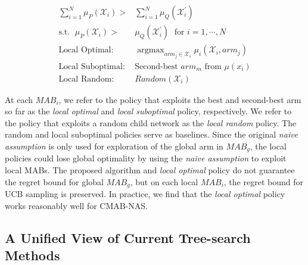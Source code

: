 \documentclass[conference]{IEEEtran}
\def \X {\mathcal{X}}
\DeclareMathOperator*{\argmax}{argmax}
\begin{document}
\begin{linenomath*}
\begin{align} 
\label{navie_assumption_2}
\sum_{i=1}^{N}\mu_{P}(\X_{i}) >& \sum_{i=1}^{N}\mu_{Q}(\X^\prime_{i}) \\
\nonumber \text{s.t. } \; \mu_{P}(\mathcal{X}_{i}) >& \mu_{Q}(\mathcal{X}^\prime_{i}) \;  \text{ for } i = 1, \cdots, N \\
\label{optimal_policy} \text{Local Optimal: }     & \argmax_{arm_j\in\X_i} \mu_i(\X_{i}, arm_j) \\ 
\label{sub-optimal_Policy} \text{Local Suboptimal: } & \text{Second-best $arm_m$ from $\mu(x_{i})$}   \\
\text{Local Random: } & Random(\mathcal{X}_{i})\label{random_policy}
\end{align}
\end{linenomath*}

At each $MAB_i$, we refer to the policy that exploits the best and second-best arm so far as the \emph{local optimal} and \emph{local suboptimal} policy, respectively. We refer to the policy that exploits a random child network as the \emph{local random} policy. The random and local suboptimal policies serve as baselines. Since the original \emph{naive assumption} is only used for exploration of the global arm in $MAB_g$, the local policies could lose global optimality by using the \emph{naive assumption} to exploit local MABs. The proposed algorithm and \emph{local optimal} policy do not guarantee the regret bound for global $MAB_g$, but on each local $MAB_i$, the regret bound for UCB sampling is preserved. 
In practice, we find that the \emph{local optimal} policy works reasonably well for CMAB-NAS.

\subsection{A Unified View of Current Tree-search Methods}
\end{document}
